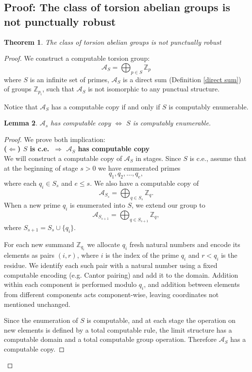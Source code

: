 \documentclass{pracalicmgr2025}
\theoremstyle{plain}            %
\newtheorem{theorem}{Theorem}[chapter]
\newtheorem{lemma}[theorem]{Lemma}
\theoremstyle{remark}           %
\theoremstyle{definition}       %
\begin{document}
\subsection{Proof: The class of torsion abelian groups is not punctually robust}
\begin{theorem} \label{torsion proof}
    The class of torsion abelian groups is not punctually robust 
\end{theorem}
\begin{proof}
We construct a computable torsion group:
$$\mathcal{A}_S = \bigoplus_{p \in S}\mathbb{Z}_p$$
where $S$ is an infinite set of primes, $\mathcal{A}_S$ is a direct sum (Definition \ref{direct sum}) of groups $\mathbb{Z}_{p_i}$, such that $\mathcal{A}_S$ is not isomorphic to any punctual structure.

Notice that $\mathcal{A}_S$ has a computable copy if and only if $S$ is computably enumerable.
\begin{lemma} \label{S c.e iff A_s computable}
$\mathcal{A}_s$ has computable copy $\iff$ $S$ is computably enumerable. 
\end{lemma}
\begin{proof}
We prove both implication:
\\
\noindent\textbf{($\Leftarrow$) $S$ is c.e.\ $\Rightarrow$ $\mathcal{A}_S$ has computable copy}  
\\
We will construct a computable copy of $\mathcal{A}_S$ in stages. Since $S$ is c.e., assume that at the beginning of stage $s>0$ we have enumerated primes  
$$
q_1, q_2, \dots, q_e,
$$
where each $q_i \in S_s$ and $e \le s$. We also have a computable copy of  
$$
\mathcal{A}_{S_s} = \bigoplus_{q \in S_s} \mathbb{Z}_q.
$$
When a new prime $q_i$ is enumerated into $S$, we extend our group to  
$$
\mathcal{A}_{S_{s+1}} = \bigoplus_{q \in S_{s+1}} \mathbb{Z}_q,
$$
where $S_{s+1} = S_s \cup \{q_i\}$.

For each new summand $\mathbb{Z}_{q_i}$ we allocate $q_i$ fresh natural numbers and encode its elements as pairs $(i, r)$, where $i$ is the index of the prime $q_i$ and $r < q_i$ is the residue. We identify each such pair with a natural number using a fixed computable encoding (e.g. Cantor pairing) and add it to the domain. Addition within each component is performed modulo $q_i$, and addition between elements from different components acts component-wise, leaving coordinates not mentioned unchanged.

Since the enumeration of $S$ is computable, and at each stage the operation on new elements is defined by a total computable rule, the limit structure has a computable domain and a total computable group operation. Therefore $\mathcal{A}_S$ has a computable copy.


\end{proof}
\end{proof}
\end{document}

